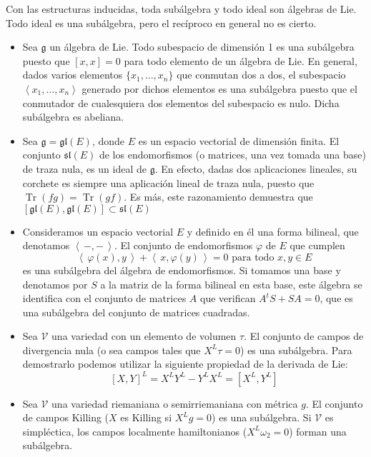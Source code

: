 \documentclass[a4paper,draft,12pt]{article}
\newcommand{\g}{\mathfrak{g}}%
\newcommand{\escalar}[2]{\left\langle\, #1,#2\, \right\rangle}  %
\newcommand{\df}[1]{\textsf{\color{blue}#1}}
\DeclareMathOperator{\Traza}{Tr}  %
\begin{document}
Con las estructuras inducidas, toda subálgebra y todo ideal son  álgebras de Lie. Todo ideal  es una subálgebra, pero el recíproco en general no es cierto.
 
 \bigskip


\begin{itemize}

\item Sea $\g$ un álgebra de Lie.  Todo subespacio de dimensión 1 es una subálgebra puesto que $[x,x]=0$ para todo elemento de un álgebra de Lie. En general, dados varios elementos $\{x_1, \dots ,x_n\}$ que conmutan dos a dos, el subespacio $\left\langle x_1, \dots, x_n \right \rangle$ generado por dichos elementos es una subálgebra puesto que el conmutador de cualesquiera dos elementos del subespacio es nulo.  Dicha subálgebra  es abeliana. 


\item Sea  $\g = \mathfrak{gl} (E)$, donde $E$ es un espacio vectorial de dimensión finita. El conjunto  $\mathfrak{sl}(E)$ de los endomorfismos (o matrices, una vez tomada una base) de traza nula, es un ideal de  $\g$. En efecto, dadas dos aplicaciones lineales, su corchete es siempre una aplicación lineal de traza nula, puesto que $\Traza(fg)= \Traza(gf)$. Es más, este razonamiento demuestra que $[\mathfrak{gl}(E),\mathfrak{gl}(E)] \subset \mathfrak{sl}(E)$

\item Consideramos un espacio vectorial $E$ y definido en él una forma bilineal, que denotamos $\escalar{-}{-}$. El conjunto de endomorfismos $\varphi$ de $E$ que cumplen
\[
\escalar{\varphi(x)}{y} + \escalar{x}{\varphi(y)} = 0 \text{ para todo } x,y \in E
\]
es una subálgebra del álgebra de endomorfismos.  Si tomamos una base y denotamos por $S$ a la matriz de la forma bilineal en esta base, este álgebra se identifica con el conjunto de matrices $A$ que verifican $A^tS+SA=0$, que es una subálgebra del conjunto de matrices cuadradas.


\item Sea  $\mathcal{V}$  una variedad con un elemento de volumen $\tau$.  El conjunto de campos de  \df{divergencia}  nula (o sea campos tales que $X^L \tau  = 0$) es una subálgebra. Para demostrarlo podemos utilizar la siguiente propiedad de la derivada de Lie:
\[
[X,Y]^L = X^L Y^L - Y^L X^L= [X^L, Y^L]
\]

\item Sea  $\mathcal{V}$  una variedad riemaniana o semirriemaniana con métrica  $g$. El conjunto de  \df{campos Killing}  ($X$ es Killing si $X^L g = 0$) es una subálgebra. Si   $\mathcal{V}$ es simpléctica, los  \df{campos localmente hamiltonianos}  ($X^L \omega_2 = 0$) forman una subálgebra.


\end{itemize}
\end{document}
